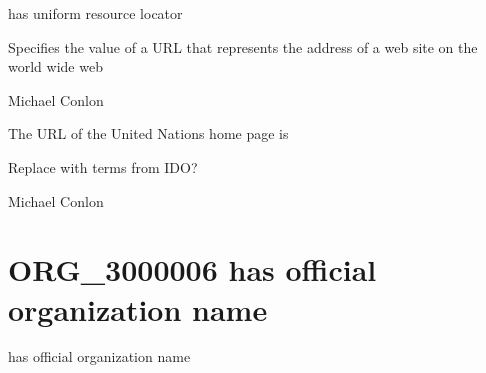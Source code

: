 \documentclass[letterpaper,10pt,english]{sphinxmanual}
\begin{document}
\begin{sphinxShadowBox}

\sphinxAtStartPar
has uniform resource locator
\end{sphinxShadowBox}

\begin{sphinxShadowBox}

\sphinxAtStartPar
Specifies the value of a URL that represents the address of a web site on the world wide web
\end{sphinxShadowBox}

\begin{sphinxShadowBox}

\sphinxAtStartPar
Michael Conlon 
\end{sphinxShadowBox}

\begin{sphinxShadowBox}

\sphinxAtStartPar
The URL of the United Nations home page is 
\end{sphinxShadowBox}

\begin{sphinxShadowBox}

\sphinxAtStartPar
Replace with terms from IDO?
\end{sphinxShadowBox}

\begin{sphinxShadowBox}

\sphinxAtStartPar
Michael Conlon 
\end{sphinxShadowBox}
\begin{quote}
\label{\detokenize{doc-ORG_3000006:org-3000006}}\label{\detokenize{doc-ORG_3000006:has-official-organization-name}}\label{\detokenize{doc-ORG_3000006:org-3000006}}
\ignorespaces \end{quote}


\section{ORG\_3000006 \sphinxhyphen{} has official organization name}
\label{\detokenize{doc-ORG_3000006:org-3000006-has-official-organization-name}}\label{\detokenize{doc-ORG_3000006:index-0}}\label{\detokenize{doc-ORG_3000006::doc}}
\begin{sphinxShadowBox}

\sphinxAtStartPar
has official organization name
\end{sphinxShadowBox}
\end{document}
